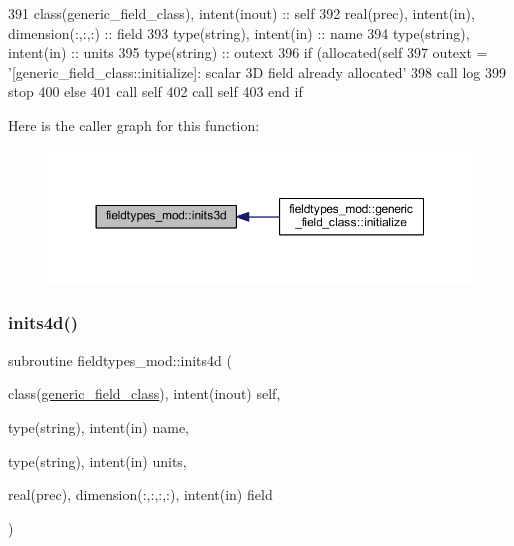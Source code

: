 \begin{DoxyCode}
391     \textcolor{keywordtype}{class}(generic\_field\_class), \textcolor{keywordtype}{intent(inout)} :: self
392     \textcolor{keywordtype}{real(prec)}, \textcolor{keywordtype}{intent(in)}, \textcolor{keywordtype}{dimension(:,:,:)} :: field
393     \textcolor{keywordtype}{type}(string), \textcolor{keywordtype}{intent(in)} :: name
394     \textcolor{keywordtype}{type}(string), \textcolor{keywordtype}{intent(in)} :: units
395     \textcolor{keywordtype}{type}(string) :: outext
396     \textcolor{keywordflow}{if} (\textcolor{keyword}{allocated}(self%
397         outext = \textcolor{stringliteral}{'[generic\_field\_class::initialize]: scalar 3D field already allocated'}
398         \textcolor{keyword}{call }log%
399         stop
400     \textcolor{keywordflow}{else}
401         \textcolor{keyword}{call }self%
402         \textcolor{keyword}{call }self%
403 \textcolor{keywordflow}{    end if}
\end{DoxyCode}
Here is the caller graph for this function\+:\nopagebreak
\begin{figure}[H]
\begin{center}
\leavevmode
\includegraphics[width=350pt]{namespacefieldtypes__mod_a750ce2c729d98ea7031c839a3a5ebd7c_icgraph}
\end{center}
\end{figure}
\mbox{\label{namespacefieldtypes__mod_a1987bd94293cfd9e35016ac5992501cd}} 
\subsubsection{\texorpdfstring{inits4d()}{inits4d()}}
{\footnotesize\ttfamily subroutine fieldtypes\+\_\+mod\+::inits4d (\begin{DoxyParamCaption}\item[{class(\mbox{\hyperlink{structfieldtypes__mod_1_1generic__field__class}{generic\+\_\+field\+\_\+class}}), intent(inout)}]{self,  }\item[{type(string), intent(in)}]{name,  }\item[{type(string), intent(in)}]{units,  }\item[{real(prec), dimension(\+:,\+:,\+:,\+:), intent(in)}]{field }\end{DoxyParamCaption})\hspace{0.3cm}{\ttfamily [private]}}



